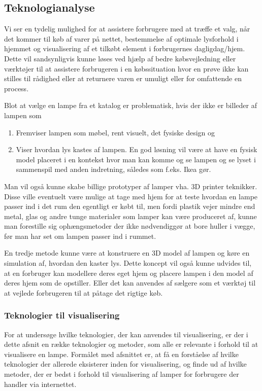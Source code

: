 \subsection{Teknologianalyse}
\label{sec:teknologianalyse}
Vi ser en tydelig mulighed for at assistere forbrugere med at træffe et valg, når det kommer til køb af varer på nettet, bestemmelse af optimale lysforhold i hjemmet og visualisering af et tilkøbt element i forbrugernes dagligdag/hjem. Dette vil sandsynligvis kunne løses ved hjælp af bedre købsvejledning eller værktøjer til at assistere forbrugeren i en købssituation hvor en prøve ikke kan stilles til rådighed eller at returnere varen er umuligt eller for omfattende en process.

Blot at vælge en lampe fra et katalog er problematisk, hvis der ikke er billeder af lampen som
\begin{enumerate}
    \item Fremviser lampen som møbel, rent visuelt, det fysiske design og 
    \item Viser hvordan lys kastes af lampen. En god løsning vil være at have en fysisk model placeret i en kontekst hvor man kan komme og se lampen og se lyset i sammenspil med anden indretning, således som f.eks. Ikea gør.
\end{enumerate}

Man vil også kunne skabe billige prototyper af lamper vha. 3D printer teknikker. Disse ville eventuelt være mulige at tage med hjem for at teste hvordan en lampe passer ind i det rum den egentligt er købt til, men fordi plastik vejer mindre end metal, glas og andre tunge materialer som lamper kan være produceret af, kunne man forestille sig ophængsmetoder der ikke nødvendiggør at bore huller i vægge, før man har set om lampen passer ind i rummet.

En tredje metode kunne være at konstruere en 3D model af lampen og køre en simulation af, hvordan den kaster lys. Dette koncept vil også kunne udvides til, at en forbruger kan modellere deres eget hjem og placere lampen i den model af deres hjem som de opstiller. Eller det kan anvendes af sælgere som et værktøj til at vejlede forbrugeren til at påtage det rigtige køb.


\subsubsection{Teknologier til visualisering}
For at undersøge hvilke teknologier, der kan anvendes til visualisering, er der i dette afsnit en række teknologier og metoder, som alle er relevante i forhold til at visualisere en lampe. Formålet med afsnittet er, at få en forståelse af hvilke teknologier der allerede eksisterer inden for visualisering, og finde ud af hvilke metoder, der er bedst i forhold til visualisering af lamper for forbrugere der handler via internettet.

